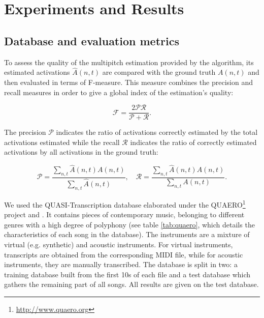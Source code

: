 \documentclass{article}
\begin{document}

\section{Experiments and Results}
\label{sec:expres}


\subsection{Database and evaluation metrics}


To assess the quality of the multipitch estimation provided by the algorithm, %
its estimated activations $\hat{A}(n,t)$ are compared with the ground truth $A(n,t)$ and then evaluated in terms of F-measure. This measure combines the precision and recall measures in order to give a global index of the estimation's quality:


$$\mathcal{F}  = \frac{2\mathcal{P}\mathcal{R}}{\mathcal{P}+\mathcal{R}}.$$


The precision $\mathcal{P}$ indicates the ratio of activations correctly estimated by the total activations estimated while the recall $\mathcal{R}$ indicates the ratio of correctly estimated activations by all activations in the ground truth:


$$\mathcal{P}  = \frac{\sum_{n,t}\hat{A}(n,t)A(n,t)}{\sum_{n,t}\hat{A}(n,t)}, \quad \mathcal{R}  = \frac{\sum_{n,t}\hat{A}(n,t)A(n,t)}{\sum_{n,t}A(n,t)}.$$


We used the QUASI-Transcription database elaborated under the QUAERO\footnote{\url{http://www.quaero.org}} project and \cite{Fuentes2013_PhD}. It contains pieces of contemporary music, belonging to different genres with a high degree of polyphony (see table \ref{tab:quaero}, which details the characteristics of each song in the database). The instruments are a mixture of virtual (e.g. synthetic) and acoustic instruments. For virtual instruments, transcripts are obtained from the corresponding MIDI file, while for acoustic instruments, they are manually transcribed.
The database is split in two: a training database built from the first 10s of each file and a test database  which gathers the remaining part of all songs. All results are given on the test database.
\end{document}
